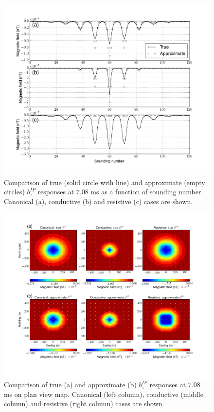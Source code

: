 \documentclass[a4paper, 11pt]{article}
\begin{document}
\begin{figure}[htb]
  \centering \includegraphics[width=1.0\textwidth]{figures/threecasesavg/trueapproxdIP.png}
  \caption{Comparison of true (solid circle with line) and approximate (empty circles) $b_z^{IP}$ responses at 7.08 ms as a function of sounding number. Canonical (a), conductive (b) and resistive (c) cases are shown. }
  \label{F:trueapproxdIP}
\end{figure}

\begin{figure}[htb]
  \centering \includegraphics[width=1.0\textwidth]{figures/threecasesavg/trueapproxdIPplan.png}
  \caption{Comparison of true (a) and approximate (b) $b_z^{IP}$ responses at 7.08 ms on plan view map. Canonical (left column), conductive (middle column) and resistive (right column) cases are shown.}
  \label{F:trueapproxdIPplan}
\end{figure}
\end{document}
